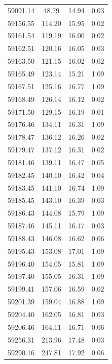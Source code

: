 \begin{longtable}{|c|c|c|c|}
 59091.14 &   48.79 &       14.94 &          0.03 \\
 59156.55 &  114.20 &       15.95 &          0.02 \\
 59161.54 &  119.19 &       16.00 &          0.02 \\
 59162.51 &  120.16 &       16.05 &          0.03 \\
 59163.50 &  121.15 &       16.02 &          0.02 \\
 59165.49 &  123.14 &       15.21 &          1.09 \\
 59167.51 &  125.16 &       16.77 &          1.09 \\
 59168.49 &  126.14 &       16.12 &          0.02 \\
 59171.50 &  129.15 &       16.19 &          0.01 \\
 59176.46 &  134.11 &       16.31 &          1.09 \\
 59178.47 &  136.12 &       16.26 &          0.02 \\
 59179.47 &  137.12 &       16.31 &          0.02 \\
 59181.46 &  139.11 &       16.47 &          0.05 \\
 59182.45 &  140.10 &       16.42 &          0.04 \\
 59183.45 &  141.10 &       16.74 &          1.09 \\
 59185.45 &  143.10 &       16.39 &          0.03 \\
 59186.43 &  144.08 &       15.79 &          1.09 \\
 59187.46 &  145.11 &       16.47 &          0.03 \\
 59188.43 &  146.08 &       16.62 &          0.06 \\
 59195.43 &  153.08 &       17.01 &          1.09 \\
 59196.40 &  154.05 &       15.81 &          1.09 \\
 59197.40 &  155.05 &       16.31 &          1.09 \\
 59199.41 &  157.06 &       16.59 &          0.02 \\
 59201.39 &  159.04 &       16.88 &          1.09 \\
 59204.40 &  162.05 &       16.81 &          0.03 \\
 59206.46 &  164.11 &       16.71 &          0.06 \\
 59256.31 &  213.96 &       17.48 &          0.03 \\
 59290.16 &  247.81 &       17.92 &          0.06 \\

\end{longtable}

